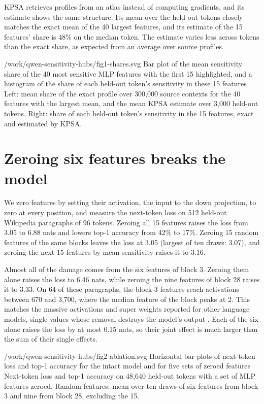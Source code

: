 \documentclass[11pt]{article}
\begin{document}
KPSA retrieves profiles from an atlas instead of computing gradients, and its estimate shows the same structure. Its mean over the held-out tokens closely matches the exact mean of the 40 largest features, and its estimate of the 15 features' share is 48\% on the median token. The estimate varies less across tokens than the exact share, as expected from an average over source profiles.

  {/work/qwen-sensitivity-hubs/fig1-shares.svg}
  {Bar plot of the mean sensitivity share of the 40 most sensitive MLP features with the first 15 highlighted, and a histogram of the share of each held-out token's sensitivity in these 15 features}
  {Left: mean share of the exact profile over 300,000 source contexts for the 40 features with the largest mean, and the mean KPSA estimate over 3,000 held-out tokens. Right: share of each held-out token's sensitivity in the 15 features, exact and estimated by KPSA.}

\section{Zeroing six features breaks the model}\label{ablation}

We zero features by setting their activation, the input to the down projection, to zero at every position, and measure the next-token loss on 512 held-out Wikipedia paragraphs of 96 tokens. Zeroing all 15 features raises the loss from 3.05 to 6.88 nats and lowers top-1 accuracy from 42\% to 17\%. Zeroing 15 random features of the same blocks leaves the loss at 3.05 (largest of ten draws: 3.07), and zeroing the next 15 features by mean sensitivity raises it to 3.16.

Almost all of the damage comes from the six features of block 3. Zeroing them alone raises the loss to 6.46 nats, while zeroing the nine features of block 28 raises it to 3.33. On 64 of these paragraphs, the block-3 features reach activations between 670 and 3,700, where the median feature of the block peaks at 2. This matches the massive activations and super weights reported for other language models, single values whose removal destroys the model's output \cite{sun2024,yu2024}. Each of the six alone raises the loss by at most 0.15 nats, so their joint effect is much larger than the sum of their single effects.

  {/work/qwen-sensitivity-hubs/fig2-ablation.svg}
  {Horizontal bar plots of next-token loss and top-1 accuracy for the intact model and for five sets of zeroed features}
  {Next-token loss and top-1 accuracy on 48,640 held-out tokens with a set of MLP features zeroed. Random features: mean over ten draws of six features from block 3 and nine from block 28, excluding the 15.}
\end{document}
